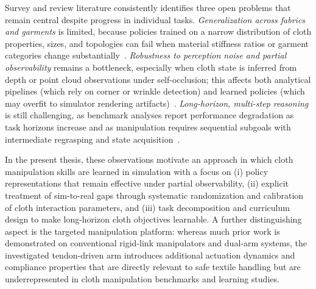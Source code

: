 Survey and review literature consistently identifies three open problems that remain central despite progress in individual tasks. \emph{Generalization across fabrics and garments} is limited, because policies trained on a narrow distribution of cloth properties, sizes, and topologies can fail when material stiffness ratios or garment categories change substantially~\cite{Sanchez2018DeformableSurvey,Gu2023DeformableSurvey,Lu2024GarmentLab}. \emph{Robustness to perception noise and partial observability} remains a bottleneck, especially when cloth state is inferred from depth or point cloud observations under self-occlusion; this affects both analytical pipelines (which rely on corner or wrinkle detection) and learned policies (which may overfit to simulator rendering artifacts)~\cite{Gu2023DeformableSurvey,BlancoMulero2024Sim2RealGap}. \emph{Long-horizon, multi-step reasoning} is still challenging, as benchmark analyses report performance degradation as task horizons increase and as manipulation requires sequential subgoals with intermediate regrasping and state acquisition~\cite{Longhini2025ClothReview,Lu2024GarmentLab}.

In the present thesis, these observations motivate an approach in which cloth manipulation skills are learned in simulation with a focus on (i) policy representations that remain effective under partial observability, (ii) explicit treatment of sim-to-real gaps through systematic randomization and calibration of cloth interaction parameters, and (iii) task decomposition and curriculum design to make long-horizon cloth objectives learnable. A further distinguishing aspect is the targeted manipulation platform: whereas much prior work is demonstrated on conventional rigid-link manipulators and dual-arm systems, the investigated tendon-driven arm introduces additional actuation dynamics and compliance properties that are directly relevant to safe textile handling but are underrepresented in cloth manipulation benchmarks and learning studies. %

